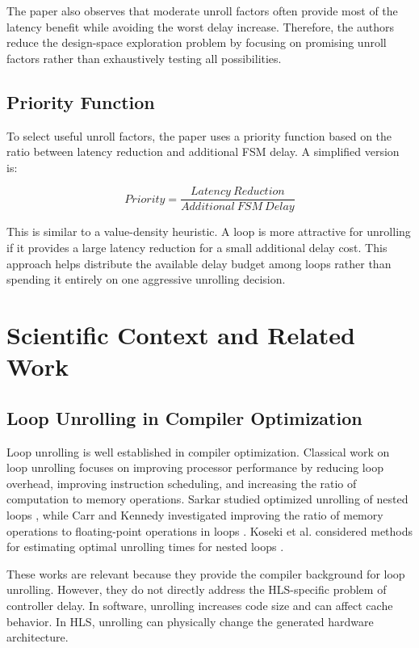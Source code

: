 \documentclass[conference]{IEEEtran}
\begin{document}
The paper also observes that moderate unroll factors often provide most of the latency benefit while avoiding the worst delay increase. Therefore, the authors reduce the design-space exploration problem by focusing on promising unroll factors rather than exhaustively testing all possibilities.

\subsection{Priority Function}

To select useful unroll factors, the paper uses a priority function based on the ratio between latency reduction and additional FSM delay. A simplified version is:

\begin{equation}
Priority = \frac{Latency\ Reduction}{Additional\ FSM\ Delay}
\end{equation}

This is similar to a value-density heuristic. A loop is more attractive for unrolling if it provides a large latency reduction for a small additional delay cost. This approach helps distribute the available delay budget among loops rather than spending it entirely on one aggressive unrolling decision.

\section{Scientific Context and Related Work}

\subsection{Loop Unrolling in Compiler Optimization}

Loop unrolling is well established in compiler optimization. Classical work on loop unrolling focuses on improving processor performance by reducing loop overhead, improving instruction scheduling, and increasing the ratio of computation to memory operations. Sarkar studied optimized unrolling of nested loops \cite{sarkar2000}, while Carr and Kennedy investigated improving the ratio of memory operations to floating-point operations in loops \cite{carr1994}. Koseki et al. considered methods for estimating optimal unrolling times for nested loops \cite{koseki1997}.

These works are relevant because they provide the compiler background for loop unrolling. However, they do not directly address the HLS-specific problem of controller delay. In software, unrolling increases code size and can affect cache behavior. In HLS, unrolling can physically change the generated hardware architecture.
\end{document}
